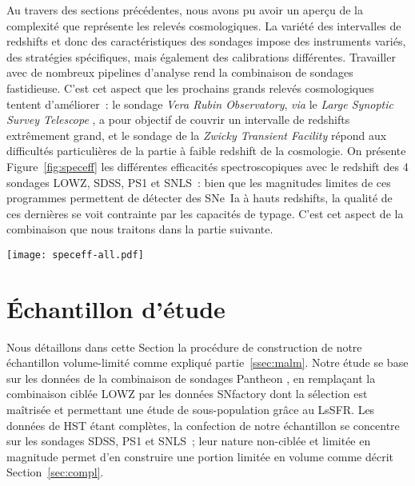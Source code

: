 \documentclass[../main/main.tex]{subfiles}
\begin{document}
Au travers des sections précédentes, nous avons pu avoir un aperçu de la
complexité que représente les relevés cosmologiques. La variété des intervalles
de redshifts et donc des caractéristiques des sondages impose des instruments
variés, des stratégies spécifiques, mais également des calibrations différentes.
Travailler avec de nombreux pipelines d'analyse rend la combinaison de sondages
fastidieuse. C'est cet aspect que les prochains grands relevés cosmologiques
tentent d'améliorer~: le sondage \textit{Vera Rubin Observatory}, \textit{via}
le \textit{Large Synoptic Survey Telescope} \citep[LSST,][]{ivezic2019}, a pour
objectif de couvrir un intervalle de redshifts extrêmement grand, et le sondage
de la \textit{Zwicky Transient Facility} \citep[ZTF,][]{bellm2019, dekany2020}
répond aux difficultés particulières de la partie à faible redshift de la
cosmologie. On présente Figure~\ref{fig:speceff} les différentes efficacités
spectroscopiques avec le redshift des 4 sondages LOWZ, SDSS, PS1 et SNLS~: bien
que les magnitudes limites de ces programmes permettent de détecter des SNe~Ia à
hauts redshifts, la qualité de ces dernières se voit contrainte par les
capacités de typage. C'est cet aspect de la combinaison que nous traitons dans
la partie suivante.

\begin{SCfigure}[0.5][h!]
    \centering
    \texttt{[image: speceff-all.pdf]}
    \caption{Comparaison des efficacités spectroscopiques des différents
    sondages.}
    \label{fig:speceff}
\end{SCfigure}

\section{Échantillon d'étude}\label{sec:sample}

Nous détaillons dans cette Section la procédure de construction de notre
échantillon volume-limité comme expliqué partie~\ref{ssec:malm}. Notre étude se
base sur les données de la combinaison de sondages Pantheon \citep{scolnic2018},
en remplaçant la combinaison ciblée LOWZ par les données SNfactory dont la
sélection est maîtrisée et permettant une étude de sous-population grâce au
LsSFR. Les données de HST étant complètes, la confection de notre échantillon se
concentre sur les sondages SDSS, PS1 et SNLS~; leur nature non-ciblée et limitée
en magnitude permet d'en construire une portion limitée en volume comme décrit
Section~\ref{sec:compl}.
\end{document}

